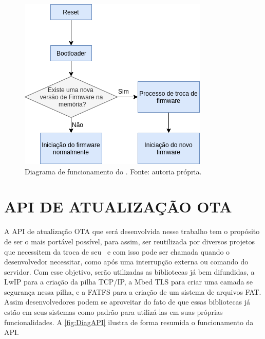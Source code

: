 \begin{figure}[H]
    \scriptsize
     \centering
     \includegraphics[scale=0.9]{dados/figuras/BootloaderDiag.png}
     \caption{Diagrama de funcionamento do \bootloader. \newline Fonte: autoria própria.}
     \label{fig:DiagBootloader}
\end{figure}



\section{API DE ATUALIZAÇÃO OTA}
\label{sec:API}

A API de atualização OTA que será desenvolvida nesse trabalho tem o propósito de ser o mais portável possível, para assim, ser reutilizada por diversos projetos que necessitem da troca de seu \software\ e com isso pode ser chamada quando o desenvolvedor necessitar, como após uma interrupção externa ou comando do servidor. Com esse objetivo, serão utilizadas as bibliotecas já bem difundidas, a LwIP para a criação da pilha TCP/IP, a Mbed TLS para criar uma camada se segurança nessa pilha, e a FATFS para a criação de um sistema de arquivos FAT. Assim desenvolvedores podem se aproveitar do fato de que essas bibliotecas já estão em seus sistemas como padrão para utilizá-las em suas próprias funcionalidades. A \autoref{fig:DiagAPI} ilustra de forma resumida o funcionamento da API.


